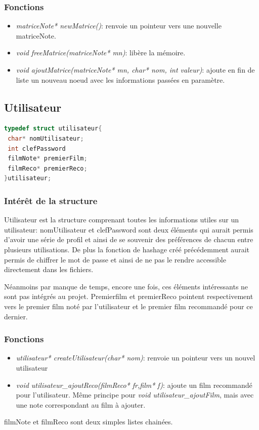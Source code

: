 \documentclass{article}
\begin{document}
\subsubsection{Fonctions}
    \begin{itemize}
        \item \textit{matriceNote* newMatrice()}: renvoie un pointeur vers une nouvelle matriceNote.
        \item \textit{void freeMatrice(matriceNote* mn)}: libère la mémoire.
        \item \textit{void ajoutMatrice(matriceNote* mn, char* nom, int valeur)}: ajoute en fin de liste un nouveau noeud avec les informations passées en paramètre.
    \end{itemize}
    

    
    
\subsection{Utilisateur}
    \begin{lstlisting}[language=C]
typedef struct utilisateur{
 char* nomUtilisateur;
 int clefPassword
 filmNote* premierFilm;
 filmReco* premierReco;
}utilisateur;
\end{lstlisting}

\subsubsection{Intérêt de la structure}
    Utilisateur est la structure comprenant toutes les informations utiles sur un utilisateur: nomUtilisateur et clefPassword sont deux éléments qui aurait permis d'avoir une série de profil et ainsi de se souvenir des préférences de chacun entre plusieurs utilisations. De plus la fonction de hashage créé précédemment aurait permis de chiffrer le mot de passe et ainsi de ne pas le rendre accessible directement dans les fichiers. \par Néanmoins par manque de temps, encore une fois, ces éléments intéressants ne sont pas intégrés au projet. Premierfilm et premierReco pointent respectivement vers le premier film noté par l'utilisateur et le premier film recommandé pour ce dernier.
\subsubsection{Fonctions}
    \begin{itemize}
        \item \textit{utilisateur* createUtilisateur(char* nom)}: renvoie un pointeur vers un nouvel utilisateur
        \item \textit{void utilisateur\_ajoutReco(filmReco* fr,film* f)}: ajoute un film recommandé pour l'utilisateur. Même principe pour \textit{void utilisateur\_ajoutFilm}, mais avec une note correspondant au film à ajouter.
    \end{itemize}
    filmNote et filmReco sont deux simples listes chainées.
\end{document}
